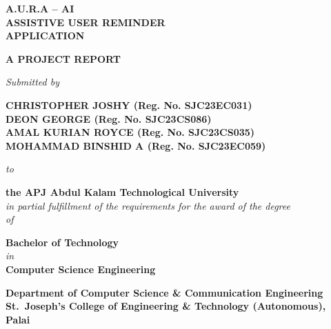 \documentclass[12pt,a4paper]{report}
\begin{document}
\begin{titlepage}
\thispagestyle{empty}
\begin{center}

\vspace*{0.3cm}
\vspace{1.5cm}

{\LARGE\bfseries A.U.R.A -- AI\\[6pt]
ASSISTIVE USER REMINDER\\[6pt]
APPLICATION}

\vspace{1.2cm}
{\large\bfseries A PROJECT REPORT}

\vspace{0.8cm}
{\normalsize\itshape Submitted by}

\vspace{0.6cm}
{\large\bfseries
CHRISTOPHER JOSHY (Reg. No. SJC23EC031)\\[4pt]
DEON GEORGE (Reg. No. SJC23CS086)\\[4pt]
AMAL KURIAN ROYCE (Reg. No. SJC23CS035)\\[4pt]
MOHAMMAD BINSHID A (Reg. No. SJC23EC059)
}

\vspace{0.8cm}
{\normalsize\itshape to}

\vspace{0.6cm}
{\large\bfseries the APJ Abdul Kalam Technological University}\\[4pt]
{\normalsize\itshape in partial fulfillment of the requirements for the award of the degree}\\[4pt]
{\normalsize\itshape of}

\vspace{0.5cm}
{\large\bfseries Bachelor of Technology}\\[4pt]
{\normalsize\itshape in}\\[4pt]
{\large\bfseries Computer Science Engineering}

\vfill

{\normalsize\bfseries Department of Computer Science \& Communication Engineering}\\[4pt]
{\normalsize\bfseries St.\ Joseph's College of Engineering \& Technology (Autonomous), Palai}

\end{center}
\end{titlepage}
\end{document}
